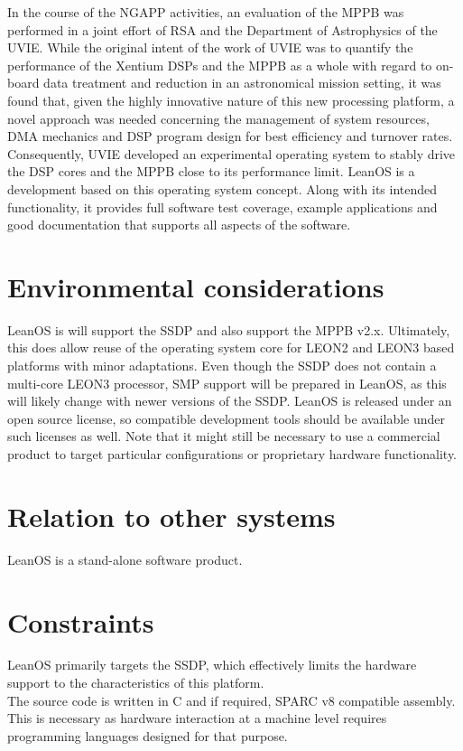 In the course of the \gls{NGAPP} activities, an evaluation of the \gls{MPPB}
was performed in a joint effort of \gls{RSA} and the Department of Astrophysics
of the \gls{UVIE}. While the original intent of the work of \gls{UVIE} was to
quantify the performance of the \gls{Xentium} \glspl{DSP} and the \gls{MPPB} as a
whole with regard to on-board data treatment and reduction in an astronomical
mission setting, it was found that, given the highly innovative nature of this new
processing platform, a novel approach was needed concerning the management of
system resources, \gls{DMA} mechanics and \gls{DSP} program design for best
efficiency and turnover rates. Consequently, \gls{UVIE} developed an experimental
operating system to stably drive the \gls{DSP} cores and the \gls{MPPB} close
to its performance limit. LeanOS is a development based on this operating system
concept. Along with its intended functionality, it provides full software test
coverage, example applications and good documentation that supports all aspects
of the software.


\section{Environmental considerations}

LeanOS is will support the \gls{SSDP} and also support the
\gls{MPPB} v2.x. Ultimately, this does allow reuse of the operating system core
for \gls{LEON2} and \gls{LEON3} based platforms with minor adaptations.
Even though the \gls{SSDP} does not contain a multi-core \gls{LEON3} processor,
\gls{SMP} support will be prepared in LeanOS, as this will likely change with
newer versions of the \gls{SSDP}.
LeanOS is released under an open source license, so compatible development tools should
be available under such licenses as well. Note that it might still be necessary
to use a commercial product to target particular configurations or proprietary
hardware functionality.


\section{Relation to other systems}

LeanOS is a stand-alone software product.


\section{Constraints}

LeanOS primarily targets the \gls{SSDP}, which effectively limits the hardware
support to the characteristics of this platform. \\
\noindent
The source code is written in C and if required, \gls{SPARC} v8 compatible
assembly. This is necessary as hardware interaction at a machine level requires
programming languages designed for that purpose.



